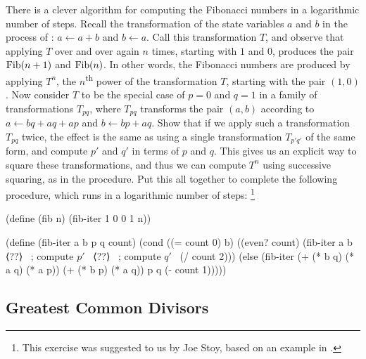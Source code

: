 \begin{exercise}
	\label{Exercise 1.19}
	There is a clever algorithm for computing the Fibonacci numbers in a logarithmic number of steps.
	Recall the transformation of the state variables \( a \) and \( b \) in the  process of :
	\( a \gets a + b \) and \( b \gets a \).
	Call this transformation \( T \), and observe that applying \( T \) over and over again \( n \) times, starting with \( 1 \) and \( 0 \), produces the pair \( \operatorname{Fib} (n + 1) \) and \( \operatorname{Fib}(n) \).
	In other words, the Fibonacci numbers are produced by applying \( T^n \), the \( n \)\textsuperscript{th} power of the transformation \( T \), starting with the pair \( (1, 0) \).
	Now consider \( T \) to be the special case of \( p = 0 \) and \( q = 1 \) in a family of transformations \( T_{pq} \), where \( T_{pq} \) transforms the pair \( (a, b) \) according to \( a \gets bq + aq + ap \) and \( b \gets bp + aq \).
	Show that if we apply such a transformation \( T_{pq} \) twice, the effect is the same as using a single transformation \( T_{p' q'} \) of the same form, and compute \( p'\) and \( q' \) in terms of \( p \) and \( q \).
	This gives us an explicit way to square these transformations, and thus we can compute \( T^n \) using successive squaring, as in the  procedure.
	Put this all together to complete the following procedure, which runs in a logarithmic number of steps:%
	\footnote{
		This exercise was suggested to us by Joe Stoy, based on an example in .
	}
	\begin{scheme}
	  (define (fib n)
	    (fib-iter 1 0 0 1 n))

	  (define (fib-iter a b p q count)
	    (cond ((= count 0) b)
	          ((even? count)
	           (fib-iter a
	                     b
	                     ⟨??⟩   ~\textrm{; compute \( p' \)}~
	                     ⟨??⟩   ~\textrm{; compute \( q' \)}~
	                     (/ count 2)))
	          (else (fib-iter (+ (* b q) (* a q) (* a p))
	                          (+ (* b p) (* a q))
	                          p
	                          q
	                          (- count 1)))))
	\end{scheme}
\end{exercise}



\subsection{Greatest Common Divisors}
\label{Section 1.2.5}


